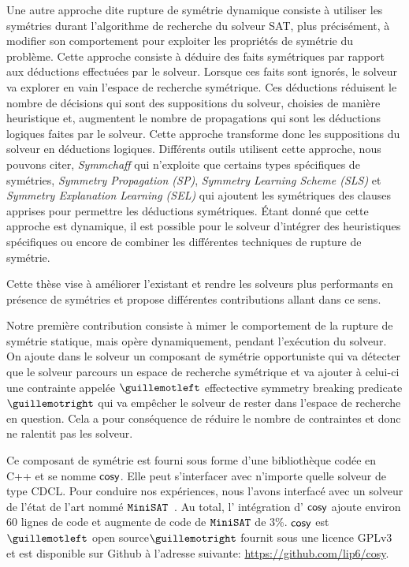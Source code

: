 Une autre approche dite rupture de symétrie dynamique consiste à utiliser les symétries durant l'algorithme de recherche du solveur SAT, plus précisément, à modifier son comportement pour exploiter les propriétés de symétrie du problème. Cette approche consiste à déduire des faits symétriques par rapport aux déductions effectuées par le solveur. Lorsque ces faits sont ignorés, le solveur va explorer en vain l'espace de recherche symétrique.
Ces déductions réduisent le nombre de décisions qui sont des suppositions du solveur, choisies de 
manière heuristique et, augmentent le nombre de propagations qui sont les déductions logiques faites par le solveur. 
Cette approche transforme donc les suppositions du solveur en déductions logiques.
Différents outils utilisent cette approche, nous pouvons citer, \textit{Symmchaff}
qui n'exploite que certains types spécifiques de symétries, \textit{Symmetry Propagation (SP)}, \textit{Symmetry Learning Scheme (SLS)} et \textit{Symmetry Explanation Learning (SEL)} qui ajoutent les symétriques des
clauses apprises pour permettre les déductions symétriques.
Étant donné que cette approche est dynamique, il est possible pour le solveur 
d'intégrer des heuristiques spécifiques ou encore de combiner les différentes techniques de rupture de symétrie.


Cette thèse vise à améliorer l'existant et rendre les solveurs plus performants en présence de symétries et
propose différentes contributions allant dans ce sens.  


Notre première contribution consiste à mimer le comportement de la rupture de symétrie statique, mais 
opère dynamiquement, pendant l'exécution du solveur. On ajoute dans le solveur un composant de symétrie opportuniste qui va détecter que le solveur parcours un espace de recherche symétrique et va ajouter à celui-ci une contrainte appelée $\guillemotleft$ effectective symmetry breaking predicate $\guillemotright$ qui va empêcher le solveur de rester dans
l'espace de recherche en question. Cela a pour conséquence de réduire le nombre de contraintes et donc 
ne ralentit pas les solveur.


Ce composant de symétrie est fourni sous forme d'une bibliothèque codée en C++ et se nomme $\textsf{cosy}$.
Elle peut s'interfacer avec n'importe quelle solveur de type CDCL. 
Pour conduire nos expériences, nous l'avons interfacé avec un solveur de l'état de l'art nommé $\texttt{MiniSAT}$~\cite{een2003extensible}. Au total, l' intégration d’ $\textsf{cosy}$ ajoute environ 60 lignes de code 
et augmente de code de $\texttt{MiniSAT}$ de 3\%.
$\textsf{cosy}$ est $\guillemotleft$ open source$\guillemotright$ fournit sous une licence GPLv3 et est disponible sur Github à l'adresse suivante: \url{https://github.com/lip6/cosy}.



